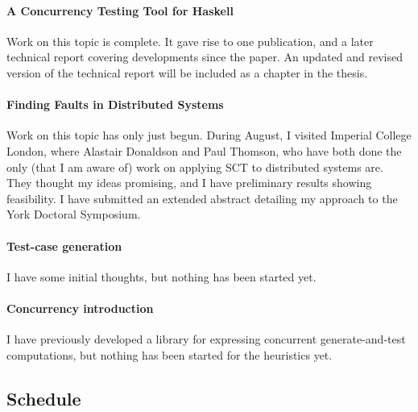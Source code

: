 \documentclass{article}
\begin{document}
\paragraph{A Concurrency Testing Tool for Haskell} Work on this topic
is complete. It gave rise to one publication\cite{walker2015}, and a
later technical report\cite{YCS-2016-503} covering developments since
the paper. An updated and revised version of the technical report will
be included as a chapter in the thesis.

\paragraph{Finding Faults in Distributed Systems} Work on this topic
has only just begun. During August, I visited Imperial College London,
where Alastair Donaldson and Paul Thomson, who have both done the only
(that I am aware of) work on applying SCT to distributed
systems\cite{deligiannis2015,deligiannis2016} are. They thought my
ideas promising, and I have preliminary results showing feasibility. I
have submitted an extended abstract detailing my approach to the York
Doctoral Symposium.

\paragraph{Test-case generation} I have some initial thoughts, but
nothing has been started yet.

\paragraph{Concurrency introduction} I have previously developed a
library for expressing concurrent generate-and-test computations, but
nothing has been started for the heuristics yet.

\subsection{Schedule}
\end{document}
